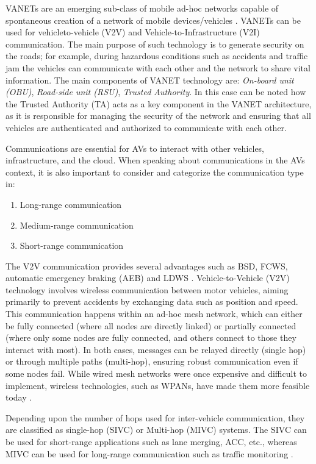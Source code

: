 VANETs are an emerging sub-class of mobile ad-hoc networks capable of spontaneous
creation of a network of mobile devices/vehicles \cite{sheikh2019comprehensive} . VANETs can be used for vehicleto-vehicle (V2V) and Vehicle-to-Infrastructure (V2I) communication. The main
purpose of such technology is to generate security on the roads; for example, during
hazardous conditions such as accidents and traffic jam the vehicles can communicate with
each other and the network to share vital information. The main components of
VANET technology are: \textit{On-board unit (OBU)}, \textit{Road-side unit (RSU)}, \textit{Trusted Authority}.
In this case can be noted how the Trusted Authority (TA) acts as a key component in the VANET architecture, as it is responsible for managing the security of the network and ensuring that all vehicles are authenticated and authorized to communicate with each other.

Communications are essential for AVs to interact with other vehicles, infrastructure, and the cloud.
When speaking about communications in the AVs context, it is also important to consider and categorize the communication type in:
\begin{enumerate}
    \item Long-range communication
    \item Medium-range communication
    \item Short-range communication
\end{enumerate}

The V2V communication provides several advantages such as BSD,
FCWS, automatic emergency braking (AEB) and LDWS \cite{arena2019overview} .
Vehicle-to-Vehicle (V2V) technology involves wireless communication between motor vehicles, aiming primarily to prevent accidents by exchanging data such as position and speed.
This communication happens within an ad-hoc mesh network, which can either be fully connected (where all nodes are directly linked) or partially connected (where only some nodes are fully connected, and others connect to those they interact with most).
In both cases, messages can be relayed directly (single hop) or through multiple paths (multi-hop), ensuring robust communication even if some nodes fail.
While wired mesh networks were once expensive and difficult to implement, wireless technologies, such as WPANs, have made them more feasible today \cite{arena2019overview} .

Depending upon the number
of hops used for inter-vehicle communication, they are classified as single-hop (SIVC) or
Multi-hop (MIVC) systems. The SIVC can be used for short-range applications such as
lane merging, ACC, etc., whereas MIVC can be used for long-range communication such
as traffic monitoring \cite{zheng2020cooperative} .


